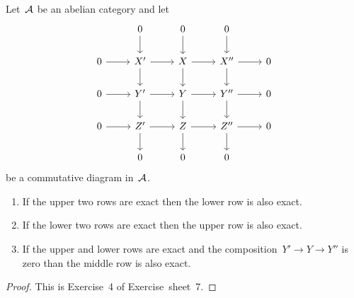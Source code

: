 \begin{lemma}[9-Lemma]
  Let~$\mathcal{A}$ be an abelian category and let
  \[
    \begin{tikzcd}
        {}
      & 0
        \arrow{d}
      & 0
        \arrow{d}
      & 0
        \arrow{d}
      & {}
      \\
        0
        \arrow{r}
      & X'
        \arrow{r}
        \arrow{d}
      & X
        \arrow{r}
        \arrow{d}
      & X''
        \arrow{r}
        \arrow{d}
      & 0
      \\
        0
        \arrow{r}
      & Y'
        \arrow{r}
        \arrow{d}
      & Y
        \arrow{r}
        \arrow{d}
      & Y''
        \arrow{r}
        \arrow{d}
      & 0
      \\
        0
        \arrow{r}
      & Z'
        \arrow{r}
        \arrow{d}
      & Z
        \arrow{r}
        \arrow{d}
      & Z''
        \arrow{r}
        \arrow{d}
      & 0
      \\
        {}
      & 0
      & 0
      & 0
      & {}
    \end{tikzcd}
  \]
  be a commutative diagram in~$\mathcal{A}$.
  \begin{enumerate}
    \item
      If the upper two rows are exact then the lower row is also exact.
    \item
      If the lower two rows are exact then the upper row is also exact.
    \item
      If the upper and lower rows are exact and the composition~$Y' \to Y \to Y''$ is zero than the middle row is also exact.
  \end{enumerate}
\end{lemma}


\begin{proof}
  This is Exercise~4 of Exercise~sheet~7.
\end{proof}






